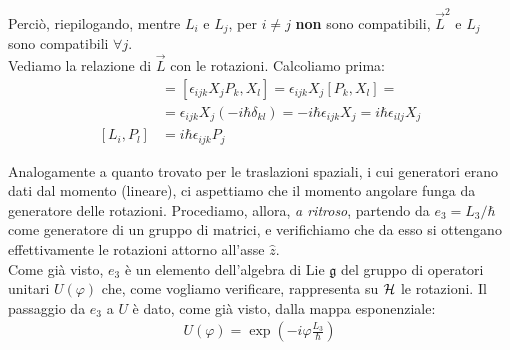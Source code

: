 \documentclass[../../FisicaTeorica.tex]{subfiles}
\begin{document}
Perciò, riepilogando, mentre $L_i$ e $L_j$, per $i\neq j$ \textbf{non} sono compatibili, $\vec{L}^2$ e $L_j$ sono compatibili $\forall j$.\\

Vediamo la relazione di $\vec{L}$ con le rotazioni. Calcoliamo prima:
\begin{align*}
[L_i, X_l]&=[\epsilon_{ijk} X_j P_k, X_l] = \epsilon_{ijk} X_j[P_k, X_l] =\\
&= \epsilon_{ijk} X_j (-i\hbar \delta_{kl}) = - i\hbar \epsilon_{ijk}X_j = i\hbar \epsilon_{ilj}X_j\\
[L_i, P_l] &= i\hbar \epsilon_{ijk} P_j
\end{align*}

Analogamente a quanto trovato per le traslazioni spaziali, i cui generatori erano dati dal momento (lineare), ci aspettiamo che il momento angolare funga da generatore delle rotazioni. Procediamo, allora, \textit{a ritroso}, partendo da $e_3 = L_3/\hbar$ come generatore di un gruppo di matrici, e verifichiamo che da esso si ottengano effettivamente le rotazioni attorno all'asse $\hat{z}$.\\
Come già visto, $e_3$ è un elemento dell'algebra di Lie $\mathfrak{g}$ del gruppo di operatori unitari $U(\varphi)$ che, come vogliamo verificare, rappresenta su $\mathcal{H}$ le rotazioni. Il passaggio da $e_3$ a $U$ è dato, come già visto, dalla mappa esponenziale:
\begin{align*}
U(\varphi) = \exp\left(-i\varphi\frac{L_3}{\hbar}\right)
\end{align*}
\end{document}
